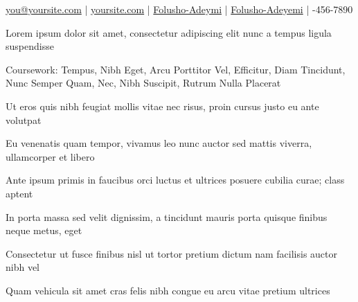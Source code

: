 \documentclass{resume-template}
\begin{document}

\begin{icons}
 \href{mailto:you@yoursite.com}{you@yoursite.com} | 
 \href{https://yoursite.com}{yoursite.com} |
 \href{https://www.linkedin.com/in/folusho-adeyemi/}{Folusho-Adeymi} |
 \href{https://github.com/folusho-adeyemi/}{Folusho-Adeyemi} |
-456-7890
\end{icons}



\begin{bullets}
\item Lorem ipsum dolor sit amet, consectetur adipiscing elit nunc a tempus ligula suspendisse
\item Coursework: Tempus, Nibh Eget, Arcu Porttitor Vel, Efficitur, Diam Tincidunt, Nunc Semper Quam, Nec, Nibh Suscipit, Rutrum Nulla Placerat
\end{bullets}



\begin{bullets}
\item Ut eros quis nibh feugiat mollis vitae nec risus, proin cursus justo eu ante volutpat
\item Eu venenatis quam tempor, vivamus leo nunc auctor sed mattis viverra, ullamcorper et libero
\item Ante ipsum primis in faucibus orci luctus et ultrices posuere cubilia curae; class aptent
\end{bullets}


\begin{bullets}
\item In porta massa sed velit dignissim, a tincidunt mauris porta quisque finibus neque metus, eget
\item Consectetur ut fusce finibus nisl ut tortor pretium dictum nam facilisis auctor nibh vel
\item Quam vehicula sit amet cras felis nibh congue eu arcu vitae pretium ultrices
\end{bullets}
\end{document}
